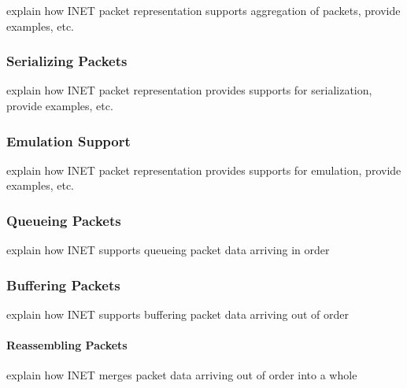 explain how INET packet representation supports aggregation of packets, provide examples, etc.



\subsubsection*{Serializing Packets}

explain how INET packet representation provides supports for serialization, provide examples, etc.




\subsubsection*{Emulation Support}

explain how INET packet representation provides supports for emulation, provide examples, etc.



\subsubsection*{Queueing Packets}

explain how INET supports queueing packet data arriving in order



\subsubsection*{Buffering Packets}

explain how INET supports buffering packet data arriving out of order

\paragraph{Reassembling Packets}

explain how INET merges packet data arriving out of order into a whole

